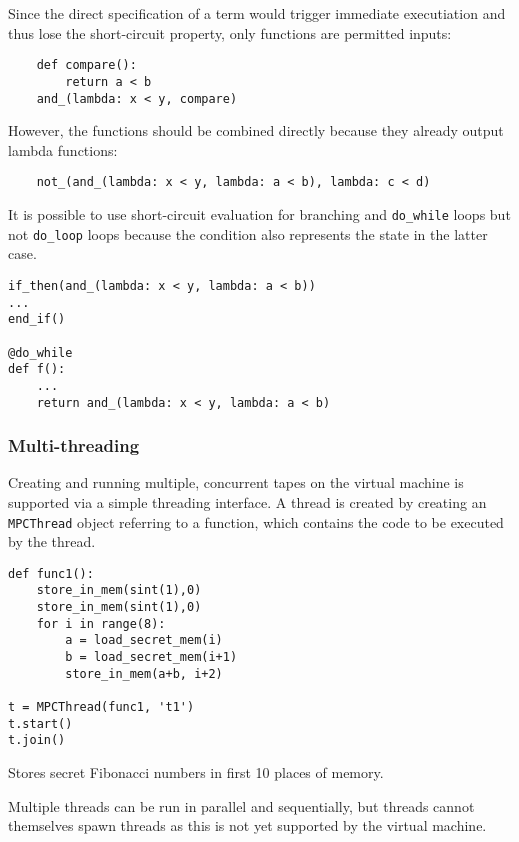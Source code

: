 Since the direct specification of a term would trigger immediate
executiation and thus lose the short-circuit property, only functions
are permitted inputs:

\begin{lstlisting}
    def compare():
        return a < b
    and_(lambda: x < y, compare)
\end{lstlisting}
However, the functions should be combined directly because they
already output lambda functions:

\begin{lstlisting}
    not_(and_(lambda: x < y, lambda: a < b), lambda: c < d)
\end{lstlisting}
It is possible to use short-circuit evaluation for branching and
\verb+do_while+ loops but not \verb+do_loop+ loops because the
condition also represents the state in the latter case.

\begin{lstlisting}
if_then(and_(lambda: x < y, lambda: a < b))
...
end_if()

@do_while
def f():
    ...
    return and_(lambda: x < y, lambda: a < b)
\end{lstlisting}

\subsubsection{Multi-threading}

Creating and running multiple, concurrent tapes on the virtual machine is
supported via a simple threading interface. A thread is created by creating
an \verb|MPCThread| object referring to a function, which contains the code
to be executed by the thread.

\begin{lstlisting}
def func1():
    store_in_mem(sint(1),0)
    store_in_mem(sint(1),0)
    for i in range(8):
        a = load_secret_mem(i)
        b = load_secret_mem(i+1)
        store_in_mem(a+b, i+2)

t = MPCThread(func1, 't1')
t.start()
t.join()
\end{lstlisting}
\begin{footnotesize}
Stores secret Fibonacci numbers in first 10 places of memory. \\
\end{footnotesize}
Multiple threads can be run in parallel and sequentially, but threads cannot
themselves spawn threads as this is not yet supported by the virtual machine.

